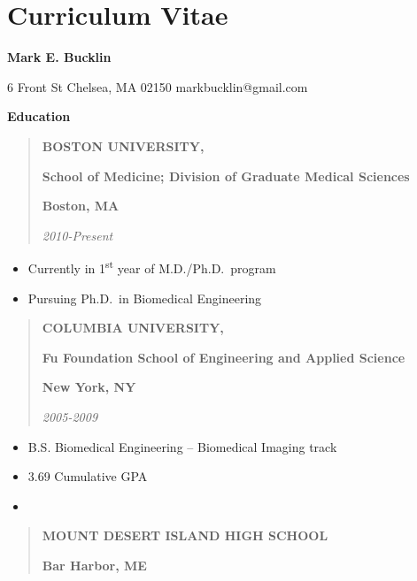 \chapter*{Curriculum Vitae}\label{sec:cv}

\thispagestyle{empty}

\begin{center}
{\large {\bf Mark E. Bucklin}}
\end{center}

6 Front St
Chelsea, MA 02150
markbucklin@gmail.com

\textbf{Education}

\begin{quote}
\textbf{BOSTON UNIVERSITY,}

\textbf{School of Medicine; Division of Graduate Medical Sciences}

\textbf{Boston, MA}

\emph{2010-Present}
\end{quote}

\begin{itemize}
\item
  Currently in 1\textsuperscript{st} year of M.D./Ph.D.~program
\item
  Pursuing Ph.D.~in Biomedical Engineering
\end{itemize}

\begin{quote}
\textbf{COLUMBIA UNIVERSITY,}

\textbf{Fu Foundation School of Engineering and Applied Science}

\textbf{New York, NY}

\emph{2005-2009}
\end{quote}

\begin{itemize}
\item
  B.S. Biomedical Engineering -- Biomedical Imaging track
\item
  3.69 Cumulative GPA
\item
\end{itemize}

\begin{quote}
\textbf{MOUNT DESERT ISLAND HIGH SCHOOL}

\textbf{Bar Harbor, ME}
\end{quote}

